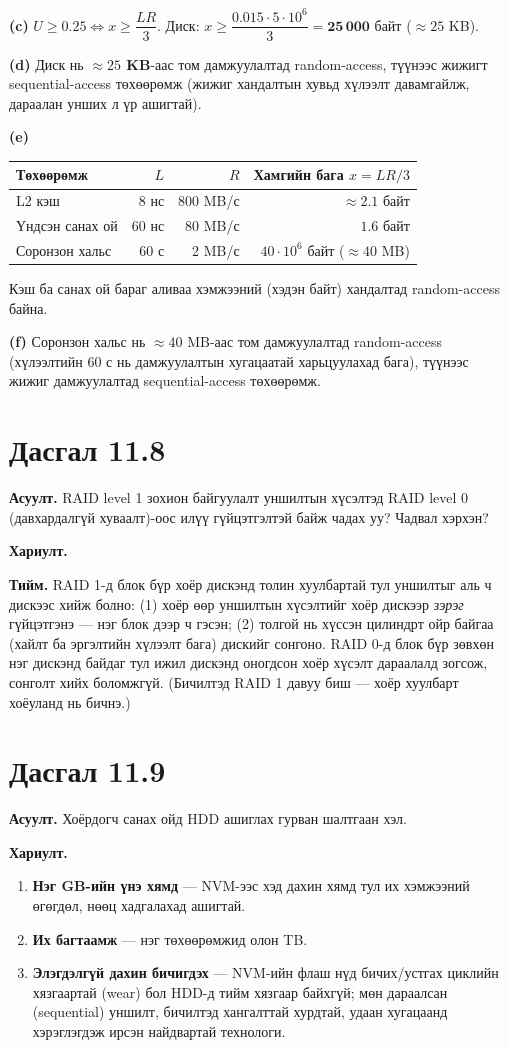 \documentclass[12pt,a4paper]{article}
\newcommand{\question}[2]{\section{Дасгал #1}\textbf{Асуулт.} #2\par\medskip\textbf{Хариулт.}\par}
\begin{document}
\textbf{(c)} $U \ge 0.25 \iff x \ge \dfrac{LR}{3}$. Диск: $x \ge \dfrac{0.015 \cdot 5 \cdot 10^6}{3} = \mathbf{25\,000}$ байт ($\approx 25$ KB).

\textbf{(d)} Диск нь \textbf{$\approx 25$ KB}-аас том дамжуулалтад random-access, түүнээс жижигт sequential-access төхөөрөмж (жижиг хандалтын хувьд хүлээлт давамгайлж, дараалан унших л үр ашигтай).

\textbf{(e)}
\begin{center}
\begin{tabular}{lrrr}
\toprule
Төхөөрөмж & $L$ & $R$ & Хамгийн бага $x = LR/3$\\
\midrule
L2 кэш & 8 нс & 800 MB/с & $\approx 2.1$ байт\\
Үндсэн санах ой & 60 нс & 80 MB/с & $1.6$ байт\\
Соронзон хальс & 60 с & 2 MB/с & $40 \cdot 10^6$ байт ($\approx 40$ MB)\\
\bottomrule
\end{tabular}
\end{center}
Кэш ба санах ой бараг аливаа хэмжээний (хэдэн байт) хандалтад random-access байна.

\textbf{(f)} Соронзон хальс нь $\approx 40$ MB-аас том дамжуулалтад random-access (хүлээлтийн 60 с нь дамжуулалтын хугацаатай харьцуулахад бага), түүнээс жижиг дамжуулалтад sequential-access төхөөрөмж.

\question{11.8}{RAID level 1 зохион байгуулалт уншилтын хүсэлтэд RAID level 0 (давхардалгүй хуваалт)-оос илүү гүйцэтгэлтэй байж чадах уу? Чадвал хэрхэн?}

\textbf{Тийм.} RAID 1-д блок бүр хоёр дискэнд толин хуулбартай тул уншилтыг аль ч дискээс хийж болно: (1) хоёр өөр уншилтын хүсэлтийг хоёр дискээр \emph{зэрэг} гүйцэтгэнэ — нэг блок дээр ч гэсэн; (2) толгой нь хүссэн цилиндрт ойр байгаа (хайлт ба эргэлтийн хүлээлт бага) дискийг сонгоно. RAID 0-д блок бүр зөвхөн нэг дискэнд байдаг тул ижил дискэнд оногдсон хоёр хүсэлт дараалалд зогсож, сонголт хийх боломжгүй. (Бичилтэд RAID 1 давуу биш — хоёр хуулбарт хоёуланд нь бичнэ.)

\question{11.9}{Хоёрдогч санах ойд HDD ашиглах гурван шалтгаан хэл.}

\begin{enumerate}[leftmargin=1.5em]
  \item \textbf{Нэг GB-ийн үнэ хямд} — NVM-ээс хэд дахин хямд тул их хэмжээний өгөгдөл, нөөц хадгалахад ашигтай.
  \item \textbf{Их багтаамж} — нэг төхөөрөмжид олон TB.
  \item \textbf{Элэгдэлгүй дахин бичигдэх} — NVM-ийн флаш нүд бичих/устгах циклийн хязгаартай (wear) бол HDD-д тийм хязгаар байхгүй; мөн дараалсан (sequential) уншилт, бичилтэд хангалттай хурдтай, удаан хугацаанд хэрэглэгдэж ирсэн найдвартай технологи.
\end{enumerate}
\end{document}
